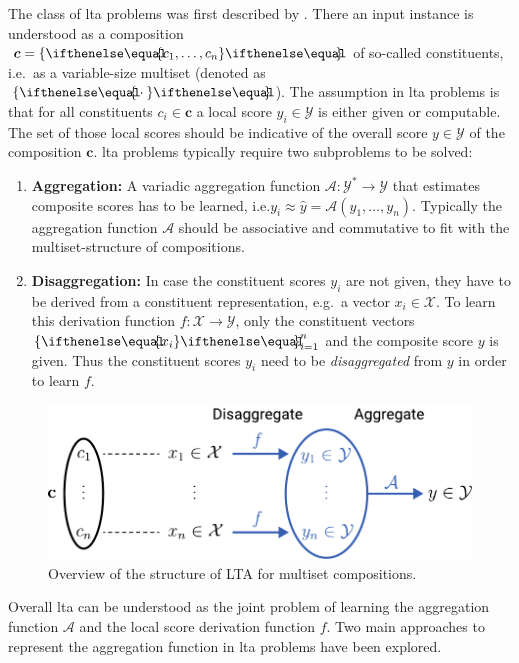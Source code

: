 The class of \ac{lta} problems was first described by \citet{Melnikov2016}.
There an input instance is understood as a composition $\bm{c} = \ldblbrace c_1, \dots, c_n \rdblbrace$ of so-called constituents, i.e.\ as a variable-size multiset (denoted as $\ldblbrace \cdot \rdblbrace$).
The assumption in \ac{lta} problems is that for all constituents $c_i \in \bm{c}$ a local score $y_i \in \mathcal{Y}$ is either given or computable.
The set of those local scores should be indicative of the overall score $y \in \mathcal{Y}$ of the composition $\bm{c}$.
\ac{lta} problems typically require two subproblems to be solved:
\begin{enumerate}[label=\textbf{\arabic*.}]
	\item \textbf{Aggregation:}
		A variadic aggregation function $\mathcal{A}: \mathcal{Y}^{*} \to \mathcal{Y}$ that estimates composite scores has to be learned, i.e.\@ $y_i \approx \hat{y} = \mathcal{A}(y_{1}, \dots, y_{n})$.
		Typically the aggregation function $\mathcal{A}$ should be associative and commutative to fit with the multiset-structure of compositions.
	\item \textbf{Disaggregation:}
		In case the constituent scores $y_i$ are not given, they have to be derived from a constituent representation, e.g.\ a vector $x_i \in \mathcal{X}$.
		To learn this derivation function $f: \mathcal{X} \to \mathcal{Y}$, only the constituent vectors ${\ldblbrace x_i \rdblbrace}_{i = 1}^{n}$ and the composite score $y$ is given.
		Thus the constituent scores $y_i$ need to be \textit{disaggregated} from $y$ in order to learn $f$.
\end{enumerate}
\begin{figure}
	\centering
	\includegraphics[width=0.7\linewidth]{gfx/related-work/lta-overview.pdf}
	\caption{Overview of the structure of LTA for multiset compositions.}\label{fig:related:lta-overview}
\end{figure}
Overall \ac{lta} can be understood as the joint problem of learning the aggregation function $\mathcal{A}$ and the local score derivation function $f$.
Two main approaches to represent the aggregation function in \ac{lta} problems have been explored.

